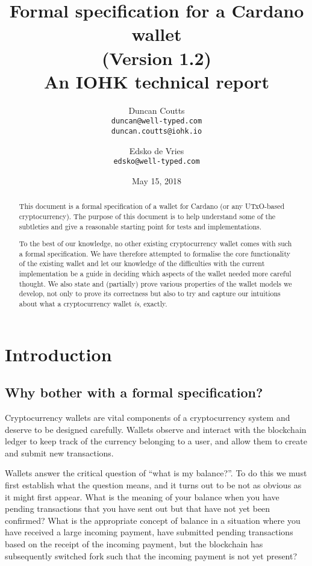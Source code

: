 \documentclass{article}
\theoremstyle{definition}{
  \newtheorem{lemma}{Lemma}[section] %
  \newtheorem{definition}[lemma]{Definition}
}
\theoremstyle{theorem}{
  \newtheorem{invariant}[lemma]{Invariant}
  \newtheorem{proofobligation}[lemma]{Proof Obligation}
}
\numberwithin{equation}{lemma}
\begin{document}
\title{Formal specification for a Cardano wallet \\
       {\small (Version 1.2)} \\
       {\large \sc An IOHK technical report}}
\author{Duncan Coutts \\ {\small \texttt{duncan@well-typed.com}} \\
                         {\small \texttt{duncan.coutts@iohk.io}}
   \and Edsko de Vries \\ {\small \texttt{edsko@well-typed.com}}}
\date{May 15, 2018}

\maketitle

\begin{abstract}
This document is a formal specification of a wallet for Cardano (or any
UTxO-based cryptocurrency). The purpose of this document is to help understand
some of the subtleties and give a reasonable starting point for tests and
implementations.

To the best of our knowledge, no other existing cryptocurrency wallet comes with
such a formal specification. We have therefore attempted to formalise the core
functionality of the existing wallet and let our knowledge of the difficulties
with the current implementation be a guide in deciding which aspects of the
wallet needed more careful thought. We also state and (partially) prove various
properties of the wallet models we develop, not only to prove its correctness
but also to try and capture our intuitions about what a cryptocurrency wallet
\emph{is}, exactly.
\end{abstract}

\section{Introduction}

\subsection{Why bother with a formal specification?}

Cryptocurrency wallets are vital components of a cryptocurrency system and
deserve to be designed carefully. Wallets observe and interact with the
blockchain ledger to keep track of the currency belonging to a user, and allow
them to create and submit new transactions.

Wallets answer the critical question of ``what is my balance?''. To do this
we must first establish what the question means, and it turns out to be not
as obvious as it might first appear. What is the meaning of your balance when
you have pending transactions that you have sent out but that have not yet been
confirmed? What is the appropriate concept of balance in a situation where you
have received a large incoming payment, have submitted pending transactions
based on the receipt of the incoming payment, but the blockchain has
subsequently switched fork such that the incoming payment is not yet present?
\end{document}
